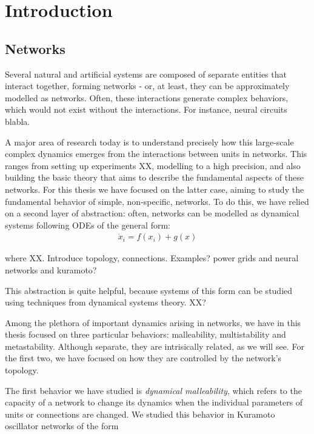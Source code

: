 \chapter{Introduction}

\section[networks]{Networks}

Several natural and artificial systems are composed of separate entities that interact together, forming networks - or, at least, they can be approximately modelled as networks. Often, these interactions generate complex behaviors, which would not exist without the interactions. For instance, neural circuits blabla.

A major area of research today is to understand precisely how this large-scale complex dynamics emerges from the interactions between units in networks. This ranges from setting up experiments XX, modelling to a high precision, and also building the basic theory that aims to describe the fundamental aspects of these networks. For this thesis we have focused on the latter case, aiming to study the fundamental behavior of simple, non-specific, networks. To do this, we have relied on a second layer of abstraction: often, networks can be modelled as dynamical systems following ODEs of the general form: 
%
\begin{align}
    \dot{x}_i = f(x_i) + g(x)
\end{align}

where XX. Introduce topology, connections. Examples? power grids and neural networks and kuramoto?

This abstraction is quite helpful, because systems of this form can be studied using techniques from dynamical systems theory. XX?

Among the plethora of important dynamics arising in networks, we have in this thesis focused on three particular behaviors: malleability, multistability and metastability. Although separate, they are intrisically related, as we will see. For the first two, we have focused on how they are controlled by the network's topology.


The first behavior we have studied is \textit{dynamical malleability}, which refers to the capacity of a network to change its dynamics when the individual parameters of units or connections are changed. We studied this behavior in Kuramoto oscillator networks of the form 

